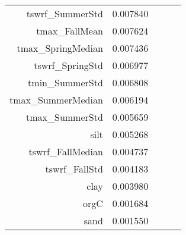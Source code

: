 \begin{tabular}{rrrrr}
tswrf_SummerStd & 0.007840 \\
tmax_FallMean & 0.007624 \\
tmax_SpringMedian & 0.007436 \\
tswrf_SpringStd & 0.006977 \\
tmin_SummerStd & 0.006808 \\
tmax_SummerMedian & 0.006194 \\
tmax_SummerStd & 0.005659 \\
silt & 0.005268 \\
tswrf_FallMedian & 0.004737 \\
tswrf_FallStd & 0.004183 \\
clay & 0.003980 \\
orgC & 0.001684 \\
sand & 0.001550 \\
\bottomrule
\end{tabular}
